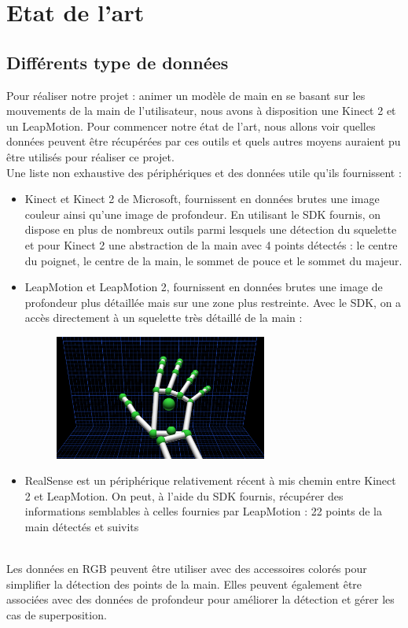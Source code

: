 \chapter{Etat de l'art}

\section{Différents type de données}
Pour réaliser notre projet : animer un modèle de main en se basant sur les mouvements de la main de l'utilisateur, nous avons à disposition une 
Kinect 2 et un LeapMotion. Pour commencer notre état de l'art, nous allons voir quelles données peuvent être récupérées par ces outils et 
quels autres moyens auraient pu être utilisés pour réaliser ce projet.\\

Une liste non exhaustive des périphériques et des données utile qu'ils fournissent : 
\begin{itemize}
  \item Kinect et Kinect 2 de Microsoft, fournissent en données brutes une image couleur ainsi qu'une image de profondeur. 
En utilisant le SDK fournis, on dispose en plus de nombreux outils parmi lesquels une détection du squelette et pour Kinect 2 
une abstraction de la main avec 4 points détectés : le centre du poignet, le centre de la main, le sommet de pouce et le sommet du majeur. 
  \item LeapMotion et LeapMotion 2, fournissent en données brutes une image de profondeur plus détaillée mais sur une zone 
plus restreinte. Avec le SDK, on a accès directement à un squelette très détaillé de la main :
    \begin{figure}[!h]
    \center
    \includegraphics[width=7cm]{images/SDK_LeapMotion.png}
    \end{figure}
  \item RealSense est un périphérique relativement récent à mis chemin entre Kinect 2 et LeapMotion. On peut, à l'aide du SDK fournis, récupérer des informations semblables à celles fournies par LeapMotion : 
  22 points de la main détectés et suivits
\end{itemize}
\ \\
Les données en RGB peuvent être utiliser avec des accessoires colorés pour simplifier la détection des points de la main. \cite{wang2009real} 
Elles peuvent également être associées avec des données de profondeur pour améliorer la détection et gérer les cas de superposition. \cite{van2011combining}

